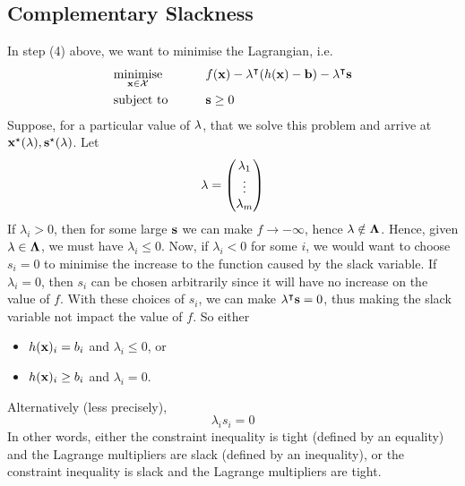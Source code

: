\subsection{Complementary Slackness}
In step (4) above, we want to minimise the Lagrangian, i.e.
\begin{alignat*}{2}
    &\underset{\vb x \in \mathcal X}{\text{minimise}}        &\qquad& f(\vb x) - \vb \lambda^\intercal (h(\vb x) - \vb b) - \vb \lambda^\intercal \vb s\\
    &\text{subject to} &      & \vb s \geq 0
    \end{alignat*}
Suppose, for a particular value of \(\vb \lambda\), that we solve this problem and arrive at \(\vb x^\star(\vb \lambda), \vb s^\star(\vb \lambda)\).
Let
\[ \vb \lambda = \begin{pmatrix}
    \lambda_1 \\ \vdots \\ \lambda_m
\end{pmatrix} \]
If \(\lambda_i > 0\), then for some large \(\vb s\) we can make \(f \to -\infty\), hence \(\vb \lambda \notin \vb \Lambda\).
Hence, given \(\vb \lambda \in \vb \Lambda\), we must have \(\lambda_i \leq 0\).
Now, if \(\lambda_i < 0\) for some \(i\), we would want to choose \(s_i = 0\) to minimise the increase to the function caused by the slack variable.
If \(\lambda_i = 0\), then \(s_i\) can be chosen arbitrarily since it will have no increase on the value of \(f\).
With these choices of \(s_i\), we can make \(\vb \lambda^\intercal \vb s = 0\), thus making the slack variable not impact the value of \(f\).
So either
\begin{itemize}
    \item \(h(\vb x)_i = b_i\) and \(\lambda_i \leq 0\), or
    \item \(h(\vb x)_i \geq b_i\) and \(\lambda_i = 0\).
\end{itemize}
Alternatively (less precisely),
\[ \lambda_i s_i = 0 \]
In other words, either the constraint inequality is tight (defined by an equality) and the Lagrange multipliers are slack (defined by an inequality), or the constraint inequality is slack and the Lagrange multipliers are tight.

